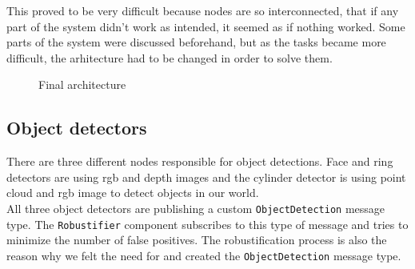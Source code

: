 \documentclass[12pt,a4paper]{article}
\begin{document}
	This proved to be very difficult because nodes are so interconnected, that if any part of the system didn't work as intended, it seemed as if nothing worked. Some parts of the system were discussed beforehand, but as the tasks became more difficult, the arhitecture had to be changed in order to solve them. \\ 
	
	\begin{figure}[h]
		\centering
		\caption{Final architecture}
		\label{fig:final_architecture}
	\end{figure}
	
	\subsection{Object detectors}
	There are three different nodes responsible for object detections. Face and ring detectors are using rgb and depth images and the cylinder detector is using point cloud and rgb image to detect objects in our world. \\
	
	All three object detectors are publishing a custom \texttt{ObjectDetection} message type. The \texttt{Robustifier} component subscribes to this type of message and tries to minimize the number of false positives. The robustification process is also the reason why we felt the need for and created the \texttt{ObjectDetection} message type. \\
	
\end{document}
